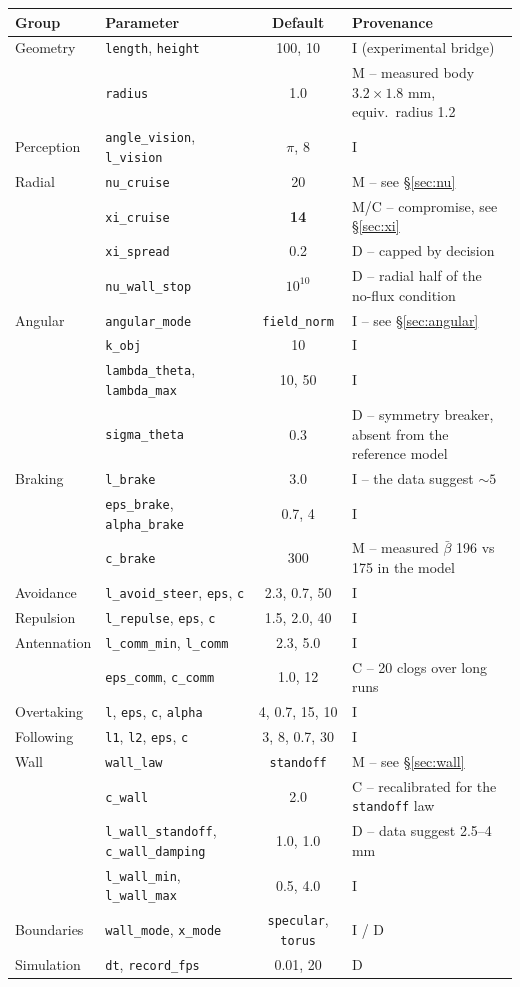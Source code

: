 \documentclass[11pt,a4paper]{article}
\newcommand{\code}[1]{\texttt{#1}}
\begin{document}
\begin{center}
\small
\begin{longtable}{@{}llcl@{}}
\toprule
Group & Parameter & Default & Provenance \\
\midrule
\endhead
Geometry & \code{length}, \code{height} & 100, 10 & I (experimental bridge) \\
 & \code{radius} & 1.0 & M -- measured body $3.2\times1.8$ mm, equiv.\ radius 1.2 \\
Perception & \code{angle\_vision}, \code{l\_vision} & $\pi$, 8 & I \\
Radial & \code{nu\_cruise} & 20 & M -- see \S\ref{sec:nu} \\
 & \code{xi\_cruise} & \textbf{14} & M/C -- compromise, see \S\ref{sec:xi} \\
 & \code{xi\_spread} & 0.2 & D -- capped by decision \\
 & \code{nu\_wall\_stop} & $10^{10}$ & D -- radial half of the no-flux condition \\
Angular & \code{angular\_mode} & \code{field\_norm} & I -- see \S\ref{sec:angular} \\
 & \code{k\_obj} & 10 & I \\
 & \code{lambda\_theta}, \code{lambda\_max} & 10, 50 & I \\
 & \code{sigma\_theta} & 0.3 & D -- symmetry breaker, absent from the reference model \\
Braking & \code{l\_brake} & 3.0 & I -- the data suggest $\sim5$ \\
 & \code{eps\_brake}, \code{alpha\_brake} & 0.7, 4 & I \\
 & \code{c\_brake} & 300 & M -- measured $\bar\beta$ 196 vs 175 in the model \\
Avoidance & \code{l\_avoid\_steer}, \code{eps}, \code{c} & 2.3, 0.7, 50 & I \\
Repulsion & \code{l\_repulse}, \code{eps}, \code{c} & 1.5, 2.0, 40 & I \\
Antennation & \code{l\_comm\_min}, \code{l\_comm} & 2.3, 5.0 & I \\
 & \code{eps\_comm}, \code{c\_comm} & 1.0, 12 & C -- 20 clogs over long runs \\
Overtaking & \code{l}, \code{eps}, \code{c}, \code{alpha} & 4, 0.7, 15, 10 & I \\
Following & \code{l1}, \code{l2}, \code{eps}, \code{c} & 3, 8, 0.7, 30 & I \\
Wall & \code{wall\_law} & \code{standoff} & M -- see \S\ref{sec:wall} \\
 & \code{c\_wall} & 2.0 & C -- recalibrated for the \code{standoff} law \\
 & \code{l\_wall\_standoff}, \code{c\_wall\_damping} & 1.0, 1.0 & D -- data suggest 2.5--4 mm \\
 & \code{l\_wall\_min}, \code{l\_wall\_max} & 0.5, 4.0 & I \\
Boundaries & \code{wall\_mode}, \code{x\_mode} & \code{specular}, \code{torus} & I / D \\
Simulation & \code{dt}, \code{record\_fps} & 0.01, 20 & D \\
\bottomrule
\end{longtable}
\end{center}
\end{document}
